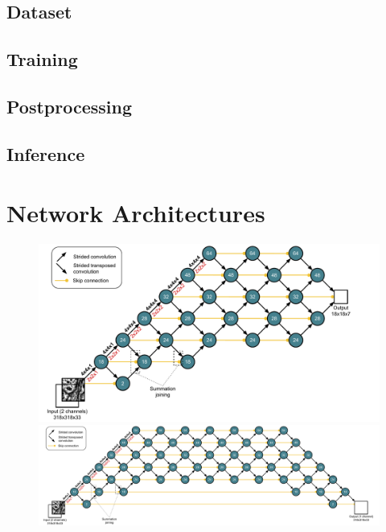 \documentclass{article}
\begin{document}
\begin{appendices}
\subsection{Dataset}

\subsection{Training}

\subsection{Postprocessing}

\subsection{Inference}


\section{Network Architectures}
\label{appendix:architecture}

\begin{figure}
\centering
\includegraphics[width=1.0\linewidth]{detector.pdf}
\centering
\includegraphics[width=1.0\linewidth]{corrector.pdf}


\end{figure}
\end{appendices}
\end{document}
